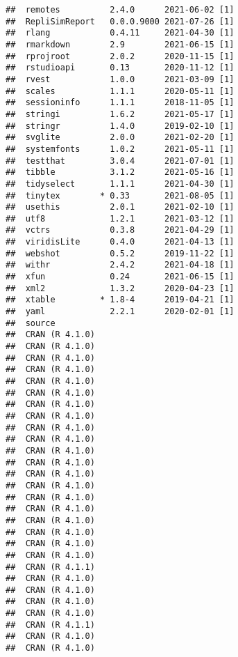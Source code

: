\documentclass[10,a4paperpaper,]{article}
\begin{document}
\begin{verbatim}
##  remotes          2.4.0      2021-06-02 [1]
##  RepliSimReport   0.0.0.9000 2021-07-26 [1]
##  rlang            0.4.11     2021-04-30 [1]
##  rmarkdown        2.9        2021-06-15 [1]
##  rprojroot        2.0.2      2020-11-15 [1]
##  rstudioapi       0.13       2020-11-12 [1]
##  rvest            1.0.0      2021-03-09 [1]
##  scales           1.1.1      2020-05-11 [1]
##  sessioninfo      1.1.1      2018-11-05 [1]
##  stringi          1.6.2      2021-05-17 [1]
##  stringr          1.4.0      2019-02-10 [1]
##  svglite          2.0.0      2021-02-20 [1]
##  systemfonts      1.0.2      2021-05-11 [1]
##  testthat         3.0.4      2021-07-01 [1]
##  tibble           3.1.2      2021-05-16 [1]
##  tidyselect       1.1.1      2021-04-30 [1]
##  tinytex        * 0.33       2021-08-05 [1]
##  usethis          2.0.1      2021-02-10 [1]
##  utf8             1.2.1      2021-03-12 [1]
##  vctrs            0.3.8      2021-04-29 [1]
##  viridisLite      0.4.0      2021-04-13 [1]
##  webshot          0.5.2      2019-11-22 [1]
##  withr            2.4.2      2021-04-18 [1]
##  xfun             0.24       2021-06-15 [1]
##  xml2             1.3.2      2020-04-23 [1]
##  xtable         * 1.8-4      2019-04-21 [1]
##  yaml             2.2.1      2020-02-01 [1]
##  source                                   
##  CRAN (R 4.1.0)                           
##  CRAN (R 4.1.0)                           
##  CRAN (R 4.1.0)                           
##  CRAN (R 4.1.0)                           
##  CRAN (R 4.1.0)                           
##  CRAN (R 4.1.0)                           
##  CRAN (R 4.1.0)                           
##  CRAN (R 4.1.0)                           
##  CRAN (R 4.1.0)                           
##  CRAN (R 4.1.0)                           
##  CRAN (R 4.1.0)                           
##  CRAN (R 4.1.0)                           
##  CRAN (R 4.1.0)                           
##  CRAN (R 4.1.0)                           
##  CRAN (R 4.1.0)                           
##  CRAN (R 4.1.0)                           
##  CRAN (R 4.1.0)                           
##  CRAN (R 4.1.0)                           
##  CRAN (R 4.1.0)                           
##  CRAN (R 4.1.0)                           
##  CRAN (R 4.1.1)                           
##  CRAN (R 4.1.0)                           
##  CRAN (R 4.1.0)                           
##  CRAN (R 4.1.0)                           
##  CRAN (R 4.1.0)                           
##  CRAN (R 4.1.1)                           
##  CRAN (R 4.1.0)                           
##  CRAN (R 4.1.0)                           

\end{verbatim}
\end{document}
